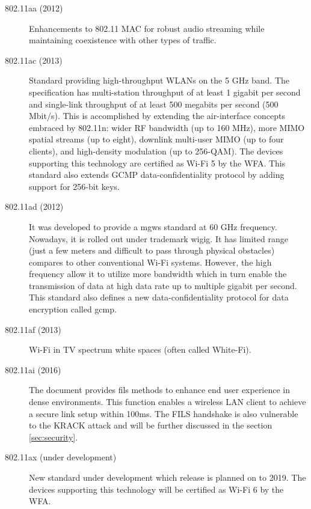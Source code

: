 \begin{description}
\item[802.11aa (2012)] Enhancements to 802.11 MAC for robust audio streaming while maintaining coexistence with other types of traffic.

\item[802.11ac (2013)] Standard providing high-throughput WLANs on the 5 GHz band. The specification has multi-station throughput of at least 1 gigabit per second and single-link throughput of at least 500 megabits per second (500 Mbit/s). This is accomplished by extending the air-interface concepts embraced by 802.11n: wider RF bandwidth (up to 160 MHz), more MIMO spatial streams (up to eight), downlink multi-user MIMO (up to four clients), and high-density modulation (up to 256-QAM). The devices supporting this technology are certified as Wi-Fi 5 by the WFA. This standard also extends GCMP data-confidentiality protocol by adding support for 256-bit keys.

\item[802.11ad (2012)] It was developed to provide a \gls{mgws} standard at 60 GHz frequency.
Nowadays, it is rolled out under trademark \gls{wigig}. It has limited range (just a few meters and difficult to pass through physical obstacles) compares to other conventional Wi-Fi systems. However, the high frequency allow it to utilize more bandwidth which in turn enable the transmission of data at high data rate up to multiple gigabit per second. This standard also defines a new data-confidentiality protocol for data encryption called \gls{gcmp}.

\item[802.11af (2013)] Wi-Fi in TV spectrum white spaces (often called White-Fi). 

\item[802.11ai (2016)] The document provides \gls{fils} methods to enhance end user experience in dense environments. This function enables a wireless LAN client to achieve a secure link setup within 100ms. The FILS handshake is also vulnerable to the KRACK attack \cite{VA_ccs2018} and will be further discussed in the section \ref{sec:security}. %

\item[802.11ax (under development)] New standard under development which release is planned on to 2019. The devices supporting this technology will be certified as Wi-Fi 6 by the WFA.
\end{description}